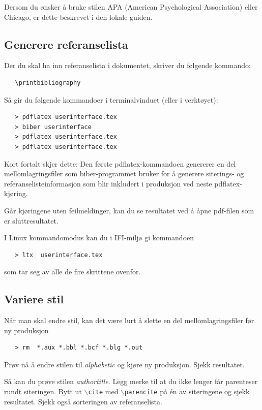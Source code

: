 \documentclass[11pt,norsk,a4paper]{article}
\newcommand{\kdo}[1]{\texttt{#1}}
\begin{document}
Dersom du ønsker å bruke stilen APA (American Psychological Association) eller Chicago, er dette beskrevet i den lokale guiden.\cite{langmyhr13}

\subsection{Generere referanselista}
Der du skal ha inn referanselista i dokumentet, skriver du følgende
kommando:

{\footnotesize\begin{verbatim}
   \printbibliography
\end{verbatim}}
\noindent{}Så gir du følgende kommandoer i terminalvinduet (eller i verktøyet):
{\footnotesize\begin{verbatim}
   > pdflatex userinterface.tex
   > biber userinterface
   > pdflatex userinterface.tex
   > pdflatex userinterface.tex
\end{verbatim}}
\noindent{}Kort fortalt skjer dette: Den første pdflatex-kommandoen genererer en
del mellomlagringsfiler som biber-programmet bruker for å generere
siterings- og referanselisteinformasjon som blir inkludert i
produksjon ved neste pdflatex-kjøring.

Går kjøringene uten feilmeldinger, kan du se resultatet ved å åpne
pdf-filen som er sluttresultatet.

I Linux kommandomodus kan du i IFI-miljø gi kommandoen 
{\footnotesize\begin{verbatim}
   > ltx  userinterface.tex 
\end{verbatim}}
\noindent{}som tar seg av alle de fire skrittene ovenfor.
\subsection{Variere stil}
Når man skal endre stil, kan det være lurt å slette en del
mellomlagringsfiler før ny produksjon 

{\footnotesize\begin{verbatim}
   > rm  *.aux *.bbl *.bcf *.blg *.out 
\end{verbatim}}
\noindent{}Prøv nå å endre stilen til \textit{alphabetic} og kjøre ny produksjon. Sjekk
resultatet.

Så kan du prøve stilen \textit{authortitle}. Legg merke til at du ikke lenger
får parenteser rundt siteringen. Bytt ut \kdo{$\backslash$cite} med
\kdo{$\backslash$parencite} på én av siteringene og sjekk resultatet. Sjekk også sorteringen av
referanselista.
\end{document}
